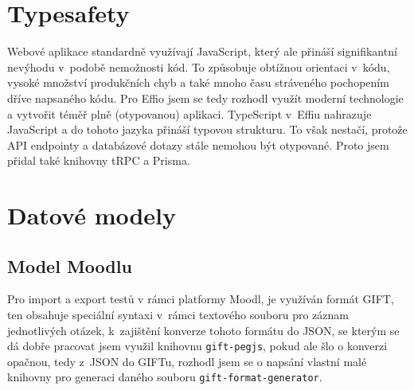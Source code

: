 \documentclass[12pt, a4paper,
openright
]{report}
\begin{document}


\section{Typesafety}
\label{sec:typesafety}

Webové aplikace standardně využívají JavaScript, který ale přináší signifikantní nevýhodu v~podobě nemožnosti  kód. To způsobuje obtížnou orientaci v~kódu, vysoké množství produkčních chyb a také mnoho času stráveného pochopením dříve napsaného kódu. Pro Effio jsem se tedy rozhodl využít moderní technologie a vytvořit téměř plně  (otypovanou) aplikaci. TypeScript v~Effiu nahrazuje JavaScript a do tohoto jazyka přináší typovou strukturu. To však nestačí, protože API endpointy a databázové dotazy stále nemohou být otypované. Proto jsem přidal také knihovny tRPC a Prisma.

\section{Datové modely}
\subsection{Model Moodlu}
Pro import a export testů v rámci platformy Moodl, je využíván formát GIFT, ten obsahuje speciální syntaxi v~rámci textového souboru pro záznam jednotlivých otázek, k~zajištění konverze tohoto formátu do JSON, se kterým se dá dobře pracovat jsem využil knihovnu \texttt{gift-pegjs}, pokud ale šlo o konverzi opačnou, tedy z~JSON do GIFTu, rozhodl jsem se o napsání vlastní malé knihovny pro generaci daného souboru \texttt{gift-format-generator}.
\end{document}
